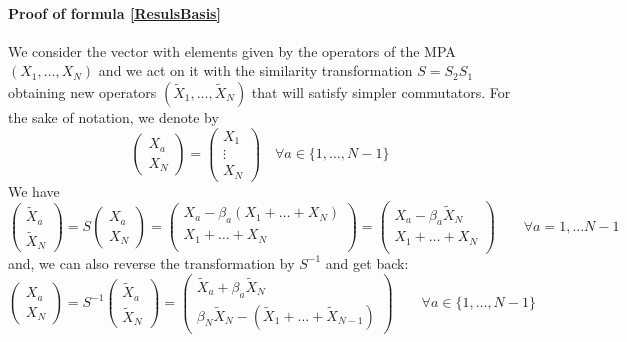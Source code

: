 \documentclass[10pt]{article}
\numberwithin{equation}{section}
\numberwithin{equation}{subsection}
\newcommand{\Xt}{\widetilde{X}}
\begin{document}
\paragraph{Proof of formula \eqref{ResulsBasis}} 
We consider the vector with elements given by the operators of the MPA $(X_{1},\ldots,X_{N})$ and we act on it with the similarity transformation $S=S_{2}S_{1}$ obtaining new operators $(\Xt_{1},\ldots,\Xt_{N})$ that will satisfy simpler commutators. 
For the sake of notation, we denote by 
\begin{equation}
    \begin{pmatrix}
		X_{a}\\ 
		X_{N}
	\end{pmatrix}=\begin{pmatrix}
	    X_{1}\\
     \vdots\\
     X_{N}
	\end{pmatrix}\quad \forall a\in \{1,\ldots,N-1\}
\end{equation}
We have
\begin{equation}\label{Xtildes2b}
	\begin{pmatrix}
		\Xt_{a}\\ 
		\Xt_{N}
	\end{pmatrix} =S\begin{pmatrix}
		X_{a}\\X_{N}
	\end{pmatrix}=\begin{pmatrix} 
		X_{a}-\beta_{a}(X_{1}+\ldots+X_{N})\\
				X_{1}+\ldots +X_{N}\\
	\end{pmatrix}=\begin{pmatrix} 
		X_{a}-\beta_{a}\Xt_{N}\\ 
			X_{1}+\ldots +X_{N}\\
	\end{pmatrix}\qquad \forall a=1,\ldots N-1
\end{equation}
and, we can also reverse the transformation by $S^{-1}$ and get back: 
\begin{equation}\label{Xes}
	\begin{pmatrix}
		X_{a}\\
		X_{N} 
	\end{pmatrix} =S^{-1}\begin{pmatrix}
		\widetilde{X}_{a}\\
		\widetilde{X}_{N}
	\end{pmatrix}=\begin{pmatrix}
		\Xt_{a}+\beta_{a}\Xt_{N}\\ 
		\beta_N\Xt_{N}-(\Xt_{1}+\ldots+\Xt_{N-1})
	\end{pmatrix}\qquad\forall a\in \{1,\ldots,N-1\}
\end{equation}
\end{document}
